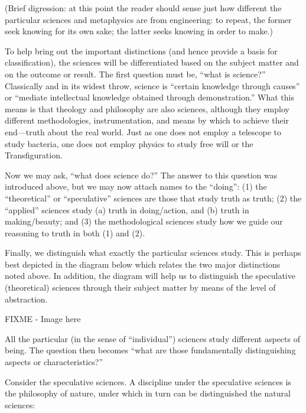 (Brief digression: at this point the reader should sense just how different the particular sciences and metaphysics are from engineering: to repeat, the former seek knowing for its own sake; the latter seeks knowing in order to make.)

To help bring out the important distinctions (and hence provide a basis for classification), the sciences will be differentiated based on the subject matter and on the outcome or result. The first question must be, “what is science?” Classically and in its widest throw, science is “certain knowledge through causes” or “mediate intellectual knowledge obtained through demonstration.” What this means is that theology and philosophy are also sciences, although they employ different methodologies, instrumentation, and means by which to achieve their end—truth about the real world. Just as one does not employ a telescope to study bacteria, one does not employ physics to study free will or the Transfiguration.

Now we may ask, “what does science do?” The answer to this question was introduced above, but we may now attach names to the “doing”: (1) the “theoretical” or “speculative” sciences are those that study truth as truth; (2) the “applied” sciences study (a) truth in doing/action, and (b) truth in making/beauty; and (3) the methodological sciences study how we guide our reasoning to truth in both (1) and (2).

Finally, we distinguish what exactly the particular sciences study. This is perhaps best depicted in the diagram below which relates the two major distinctions noted above. In addition, the diagram will help us to distinguish the speculative (theoretical) sciences through their subject matter by means of the level of abstraction.

FIXME - Image here

All the particular (in the sense of “individual”) sciences study different aspects of being. The question then becomes “what are those fundamentally distinguishing aspects or characteristics?”

Consider the speculative sciences. A discipline under the speculative sciences is the philosophy of nature, under which in turn can be distinguished the natural sciences:

